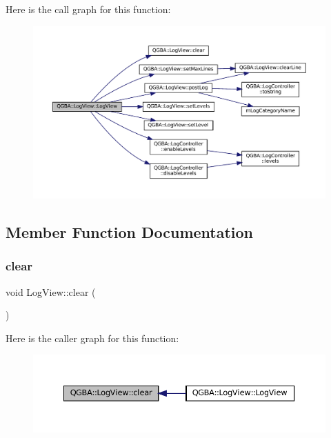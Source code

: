 Here is the call graph for this function\+:
\nopagebreak
\begin{figure}[H]
\begin{center}
\leavevmode
\includegraphics[width=350pt]{class_q_g_b_a_1_1_log_view_a7bccf99af2ec77e478716a72b8b790e5_cgraph}
\end{center}
\end{figure}


\subsection{Member Function Documentation}
\mbox{\label{class_q_g_b_a_1_1_log_view_af5262551d0e5839cbc13b53c36574bf0}} 
\subsubsection{\texorpdfstring{clear}{clear}}
{\footnotesize\ttfamily void Log\+View\+::clear (\begin{DoxyParamCaption}{ }\end{DoxyParamCaption})\hspace{0.3cm}{\ttfamily [slot]}}

Here is the caller graph for this function\+:
\nopagebreak
\begin{figure}[H]
\begin{center}
\leavevmode
\includegraphics[width=350pt]{class_q_g_b_a_1_1_log_view_af5262551d0e5839cbc13b53c36574bf0_icgraph}
\end{center}
\end{figure}
\mbox{\label{class_q_g_b_a_1_1_log_view_ab58e52a5c481261805b6b0f3a08b22a3}} 

